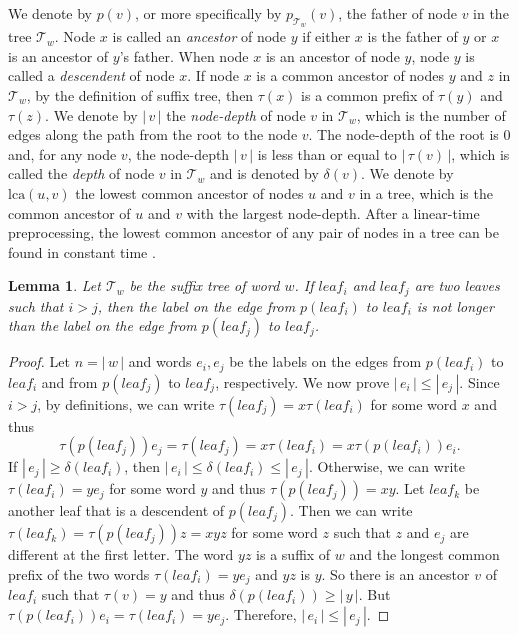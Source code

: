 \documentclass{article}
\def\abs#1{{|\,#1\,|}}
\def\tree{\mathcal{T}}
\def\lca{\mathrm{lca}}
\newtheorem{lemma}[theorem]{Lemma}
\begin{document}
We denote by $p(v)$, or more specifically by $p_{\tree_w}(v)$, the
father of node $v$ in the tree $\tree_w$. Node $x$ is called an
\emph{ancestor} of node $y$ if either $x$ is the father of $y$ or
$x$ is an ancestor of $y$'s father. When node $x$ is an ancestor of
node $y$, node $y$ is called a \emph{descendent} of node $x$. If
node $x$ is a common ancestor of nodes $y$ and $z$ in $\tree_w$, by
the definition of suffix tree, then $\tau(x)$ is a common prefix of
$\tau(y)$ and $\tau(z)$. We denote by $\abs{v}$ the
\emph{node-depth} of node $v$ in $\tree_w$, which is the number of
edges along the path from the root to the node $v$. The node-depth
of the root is $0$ and, for any node $v$, the node-depth $\abs{v}$
is less than or equal to $\abs{\tau(v)}$, which is called the
\emph{depth} of node $v$ in $\tree_w$ and is denoted by $\delta(v)$.
We denote by $\lca(u,v)$ the lowest common ancestor of nodes $u$ and
$v$ in a tree, which is the common ancestor of $u$ and $v$ with the
largest node-depth. After a linear-time preprocessing, the lowest
common ancestor of any pair of nodes in a tree can be found in
constant time \cite{Harel&Tarjan1984,Schieber&Vishkin1988}.





\begin{lemma}\label{lemma:lastedge}
Let $\tree_w$ be the suffix tree of word $w$. If $leaf_i$ and
$leaf_j$ are two leaves such that $i>j$, then the label on the edge
from $p(leaf_i)$ to $leaf_i$ is not longer than the label on the
edge from $p(leaf_j)$ to $leaf_j$.
\end{lemma}
\begin{proof}
Let $n=\abs{w}$ and words $e_i,e_j$ be the labels on the edges from
$p(leaf_i)$ to $leaf_i$ and from $p(leaf_j)$ to $leaf_j$,
respectively. We now prove $\abs{e_i}\leq\abs{e_j}$. Since $i>j$, by
definitions, we can write $\tau(leaf_j)=x\tau(leaf_i)$ for some word
$x$ and thus
  \[\tau(p(leaf_j))e_j=\tau(leaf_j)=x\tau(leaf_i)=x\tau(p(leaf_i))e_i.\]
If $\abs{e_j}\geq\delta(leaf_i)$, then
$\abs{e_i}\leq\delta(leaf_i)\leq\abs{e_j}$. Otherwise, we can write
$\tau(leaf_i)=ye_j$ for some word $y$ and thus $\tau(p(leaf_j))=xy$.
Let $leaf_k$ be another leaf that is a descendent of $p(leaf_j)$.
Then we can write $\tau(leaf_k)=\tau(p(leaf_j))z=xyz$ for some word
$z$ such that $z$ and $e_j$ are different at the first letter. The
word $yz$ is a suffix of $w$ and the longest common prefix of the
two words $\tau(leaf_i)=ye_j$ and $yz$ is $y$. So there is an
ancestor $v$ of $leaf_i$ such that $\tau(v)=y$ and thus
$\delta(p(leaf_i))\geq\abs{y}$. But
$\tau(p(leaf_i))e_i=\tau(leaf_i)=ye_j$. Therefore,
$\abs{e_i}\leq\abs{e_j}$.
\end{proof}
\end{document}
